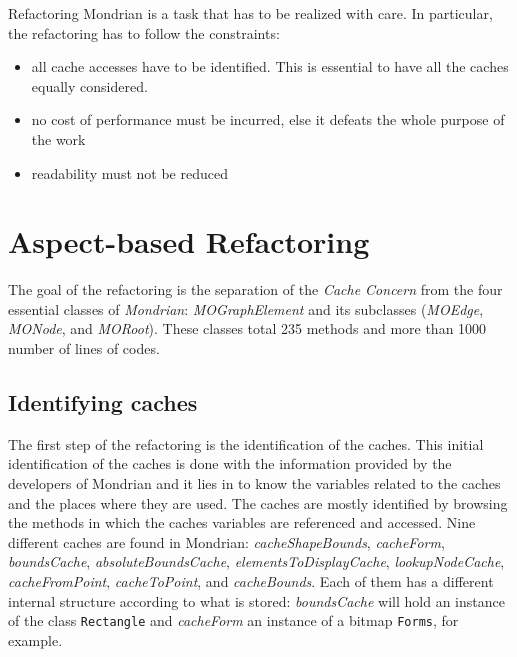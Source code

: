 \documentclass[preprint,10pt]{sigplanconf}
\newcommand{\ct}{\lstinline[backgroundcolor=\color{white},basicstyle=\footnotesize\ttfamily]}
\newcommand{\seclabel}[1]{\label{sec:#1}}
\begin{document}
Refactoring Mondrian is a task that has to be realized with care. In particular, the refactoring has to follow the constraints:

\begin{itemize}
\item all cache accesses have to be identified. This is essential to have all the caches equally considered. 
\item no cost of performance must be incurred, else it defeats the whole purpose of the work
\item readability must not be reduced
\end{itemize}

\section{Aspect-based Refactoring}\seclabel{refactoring}


The goal of the refactoring is the separation of the \emph{Cache
Concern} from the four essential classes of \emph{Mondrian}: \emph{MOGraphElement}
and its subclasses (\emph{MOEdge}, \emph{MONode}, and \emph{MORoot}). These classes total 235 methods and more than 1000 number of lines of codes.

\subsection{Identifying caches}
The first step of the refactoring is the identification of the caches.
This initial identification of the caches is done with the information
provided by the developers of Mondrian and it lies in to know the
variables related to the caches and the places where they are used. The caches are mostly identified by browsing the methods in which the caches variables are referenced and accessed.
Nine different caches are found in Mondrian: \emph{cacheShapeBounds},
\emph{cacheForm}, \emph{boundsCache}, \emph{absoluteBoundsCache},
\emph{elementsToDisplayCache}, \emph{lookupNodeCache}, \emph{cacheFromPoint},
\emph{cacheToPoint}, and \emph{cacheBounds}. Each of them has a different
internal structure according to what is stored: \emph{boundsCache} will hold an instance of the class \ct{Rectangle} and \emph{cacheForm} an instance of a bitmap \ct{Forms}, for example.
\end{document}
